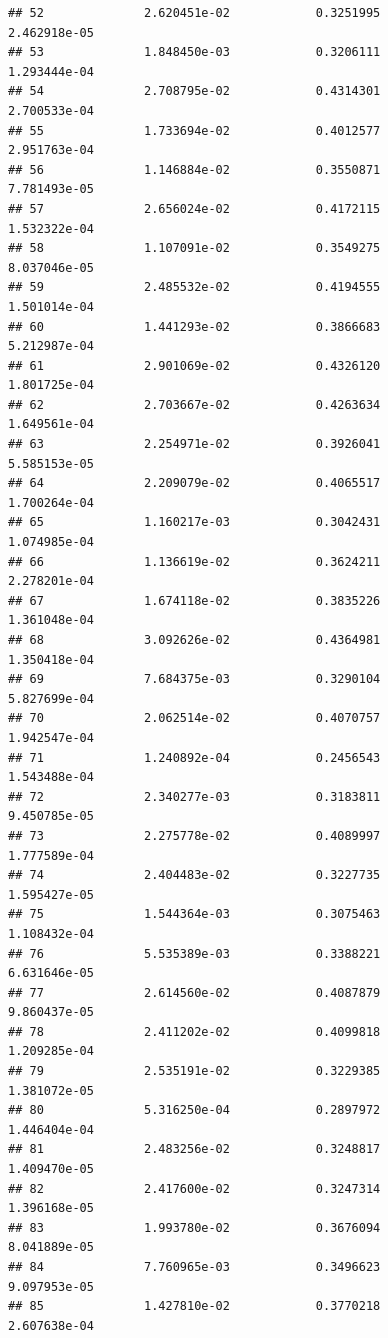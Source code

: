 \documentclass[
]{article}
\begin{document}
\begin{verbatim}
## 52              2.620451e-02            0.3251995            2.462918e-05
## 53              1.848450e-03            0.3206111            1.293444e-04
## 54              2.708795e-02            0.4314301            2.700533e-04
## 55              1.733694e-02            0.4012577            2.951763e-04
## 56              1.146884e-02            0.3550871            7.781493e-05
## 57              2.656024e-02            0.4172115            1.532322e-04
## 58              1.107091e-02            0.3549275            8.037046e-05
## 59              2.485532e-02            0.4194555            1.501014e-04
## 60              1.441293e-02            0.3866683            5.212987e-04
## 61              2.901069e-02            0.4326120            1.801725e-04
## 62              2.703667e-02            0.4263634            1.649561e-04
## 63              2.254971e-02            0.3926041            5.585153e-05
## 64              2.209079e-02            0.4065517            1.700264e-04
## 65              1.160217e-03            0.3042431            1.074985e-04
## 66              1.136619e-02            0.3624211            2.278201e-04
## 67              1.674118e-02            0.3835226            1.361048e-04
## 68              3.092626e-02            0.4364981            1.350418e-04
## 69              7.684375e-03            0.3290104            5.827699e-04
## 70              2.062514e-02            0.4070757            1.942547e-04
## 71              1.240892e-04            0.2456543            1.543488e-04
## 72              2.340277e-03            0.3183811            9.450785e-05
## 73              2.275778e-02            0.4089997            1.777589e-04
## 74              2.404483e-02            0.3227735            1.595427e-05
## 75              1.544364e-03            0.3075463            1.108432e-04
## 76              5.535389e-03            0.3388221            6.631646e-05
## 77              2.614560e-02            0.4087879            9.860437e-05
## 78              2.411202e-02            0.4099818            1.209285e-04
## 79              2.535191e-02            0.3229385            1.381072e-05
## 80              5.316250e-04            0.2897972            1.446404e-04
## 81              2.483256e-02            0.3248817            1.409470e-05
## 82              2.417600e-02            0.3247314            1.396168e-05
## 83              1.993780e-02            0.3676094            8.041889e-05
## 84              7.760965e-03            0.3496623            9.097953e-05
## 85              1.427810e-02            0.3770218            2.607638e-04

\end{verbatim}
\end{document}
